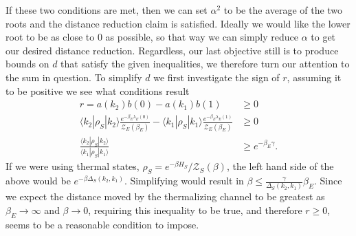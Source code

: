 \documentclass{article}
\newcommand{\ket}[1]{|#1\rangle}
\newcommand{\bra}[1]{\langle #1|}
\newcommand{\partfun}{\mathcal{Z}}
\begin{document}
If these two conditions are met, then we can set $\alpha^2$ to be the average of the two roots and the distance reduction claim is satisfied. Ideally we would like the lower root to be as close to 0 as possible, so that way we can simply reduce $\alpha$ to get our desired distance reduction. Regardless, our last objective still is to produce bounds on $d$ that satisfy the given inequalities, we therefore turn our attention to the sum in question. To simplify $d$ we first investigate the sign of $r$, assuming it to be positive we see what conditions result
\begin{align}
    r = a(k_2) b(0) - a(k_1) b(1) &\geq 0 \\
    \bra{k_2} \rho_S \ket{k_2} \frac{e^{-\beta_E \lambda_E(0)}}{\partfun_E(\beta_E)} - \bra{k_1} \rho_S \ket{k_1} \frac{e^{-\beta_E \lambda_E(1)}}{\partfun_E(\beta_E)} &\geq 0 \\
    \frac{\bra{k_2} \rho_S \ket{k_2}}{\bra{k_1} \rho_S \ket{k_1}} &\geq e^{-\beta_E \gamma}. \label{eq:bound_on_rho_s_for_r}
\end{align}
If we were using thermal states, $\rho_S = e^{-\beta H_S} / \partfun_S(\beta)$, the left hand side of the above would be $e^{-\beta \Delta_S(k_2, k_1)}$. Simplifying would result in $\beta \leq \frac{\gamma}{\Delta_S(k_2, k_1)} \beta_E$. Since we expect the distance moved by the thermalizing channel to be greatest as $\beta_E \to \infty$ and $\beta \to 0$, requiring this inequality to be true, and therefore $r \geq 0$, seems to be a reasonable condition to impose.
\end{document}

